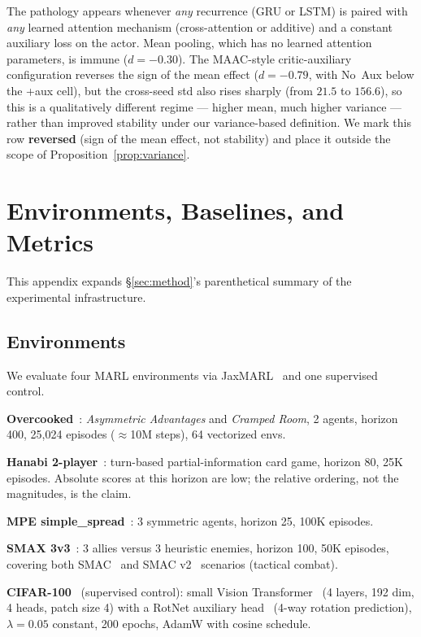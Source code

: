 \documentclass{article}
\theoremstyle{plain}
\theoremstyle{definition}
\theoremstyle{remark}
\begin{document}
The pathology appears whenever \emph{any} recurrence (GRU or LSTM) is paired
with \emph{any} learned attention mechanism (cross-attention or additive) and
a constant auxiliary loss on the actor. Mean pooling, which has no learned
attention parameters, is immune ($d = -0.30$). The MAAC-style
critic-auxiliary configuration reverses the sign of the mean effect
($d = -0.79$, with No~Aux below the +aux cell), but the
cross-seed std also rises sharply (from $21.5$ to $156.6$), so this
is a qualitatively different regime --- higher mean, much higher
variance --- rather than improved stability under our variance-based
definition. We mark this row \textbf{reversed} (sign of the mean
effect, not stability) and place it outside the scope of
Proposition~\ref{prop:variance}.


\section{Environments, Baselines, and Metrics}
\label{app:env_baselines_metrics}

This appendix expands \S\ref{sec:method}'s parenthetical summary of
the experimental infrastructure.

\subsection{Environments}
\label{app:env_specs}

We evaluate four MARL environments via
JaxMARL~\cite{rutherford2024jaxmarl} and one supervised control.

\textbf{Overcooked}~\cite{carroll2019utility}: \emph{Asymmetric
Advantages} and \emph{Cramped Room}, 2 agents, horizon 400,
25{,}024 episodes ($\approx$10M steps), 64 vectorized envs.

\textbf{Hanabi 2-player}~\cite{bard2020hanabi}: turn-based
partial-information card game, horizon 80, 25K episodes. Absolute
scores at this horizon are low; the relative ordering, not the
magnitudes, is the claim.

\textbf{MPE simple\_spread}~\cite{lowe2017multi}: 3 symmetric
agents, horizon 25, 100K episodes.

\textbf{SMAX 3v3}~\cite{rutherford2024jaxmarl}: 3 allies versus 3
heuristic enemies, horizon 100, 50K episodes, covering both
SMAC~\cite{samvelyan2019starcraft} and SMAC
v2~\cite{ellis2023smacv2} scenarios (tactical combat).

\textbf{CIFAR-100}~\cite{krizhevsky2009learning} (supervised
control): small Vision Transformer~\cite{dosovitskiy2020image}
(4 layers, 192 dim, 4 heads, patch size 4) with a RotNet auxiliary
head~\cite{gidaris2018unsupervised} (4-way rotation prediction),
$\lambda = 0.05$ constant, 200 epochs, AdamW with cosine schedule.
\end{document}
